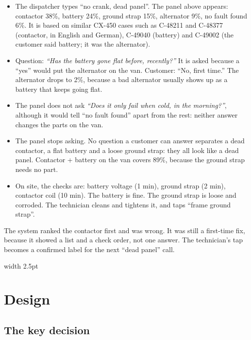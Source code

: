 \documentclass[11pt,a4paper]{article}
\newenvironment{callout}[1][accent]
  {\def\calloutcolor{#1}\par\smallskip\noindent
   \begin{lrbox}{\calloutbox}\begin{minipage}{\dimexpr\linewidth-2\fboxsep-11pt\relax}}
  {\end{minipage}\end{lrbox}%
   \colorbox{\calloutcolor!6}{\textcolor{\calloutcolor}{\vrule width 2.5pt}\hspace{8.5pt}\usebox{\calloutbox}}%
   \par\smallskip}
\begin{document}
\begin{itemize}
  \item The dispatcher types “no crank, dead panel”. The panel above appears: contactor 38\%, battery 24\%, ground strap 15\%, alternator 9\%, no fault found 6\%. It is based on similar CX-450 cases such as C-48211 and C-48377 (contactor, in English and German), C-49040 (battery) and C-49002 (the customer said battery; it was the alternator).
  \item Question: \emph{“Has the battery gone flat before, recently?”} It is asked because a “yes” would put the alternator on the van. Customer: “No, first time.” The alternator drops to 2\%, because a bad alternator usually shows up as a battery that keeps going flat.
  \item The panel does not ask \emph{“Does it only fail when cold, in the morning?”}, although it would tell “no fault found” apart from the rest: neither answer changes the parts on the van.
  \item The panel stops asking. No question a customer can answer separates a dead contactor, a flat battery and a loose ground strap: they all look like a dead panel. Contactor + battery on the van covers 89\%, because the ground strap needs no part.
  \item On site, the checks are: battery voltage (1 min), ground strap (2 min), contactor coil (10 min). The battery is fine. The ground strap is loose and corroded. The technician cleans and tightens it, and taps “frame ground strap”.
\end{itemize}

\begin{callout}
The system ranked the contactor first and was wrong. It was still a first-time fix, because it showed a list and a check order, not one answer. The technician's tap becomes a confirmed label for the next “dead panel” call.
\end{callout}

\section{Design}\label{sec:design}

\subsection{The key decision}\label{sec:shape}
\end{document}
